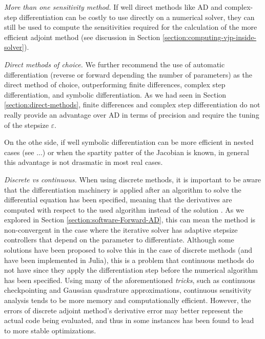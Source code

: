 \vspace{5px}
\noindent\textit{More than one sensitivity method. }
If well direct methods like AD and complex-step differentiation can be costly to use directly on a numerical solver, they can still be used to compute the sensitivities required for the calculation of the more efficient adjoint method (see discussion in Section \ref{section:computing-vjp-inside-solver}). 

\vspace{5px}
\noindent\textit{Direct methods of choice. }
We further recommend the use of automatic differentiation (reverse or forward depending the number of parameters) as the direct method of choice, outperforming finite differences, complex step differentiation, and symbolic differentiation. 
As we had seen in Section \ref{section:direct-methods}, finite differences and complex step differentiation do not really provide an advantage over AD in terms of precision and require the tuning of the stepsize $\varepsilon$. 

On the othe side, if well symbolic differentiation can be more efficient in nested cases (see ...) or when the spartity patter of the Jacobian is known, in general this advantage is not drasmatic in most real cases. 


\vspace{5px}
\noindent\textit{Discrete vs continuous. }
When using discrete methods, it is important to be aware that the differentiation machinery is applied after an algorithm to solve the differential equation has been specified, meaning that the derivatives are computed with respect to the used algorithm instead of the solution \cite{Eberhard_Bischof_1996}.
As we explored in Section \ref{section:software-Forward-AD}, this can mean the method is non-convergent in the case where the iterative solver has adaptive stepsize controllers that depend on the parameter to differentiate.
Although some solutions have been proposed to solve this in the case of discrete methods \cite{Eberhard_Bischof_1996} (and have been implemented in Julia), this is a problem that continuous methods do not have since they apply the differentiation step before the numerical algorithm has been specified. 
Using many of the aforementioned \emph{tricks}, such as continuous checkpointing and Gaussian quadrature approximations, continuous sensitivity analysis tends to be more memory and computationally efficient. However, the errors of discrete adjoint method's derivative error may better represent the actual code being evaluated, and thus in some instances has been found to lead to more stable optimizations. 

